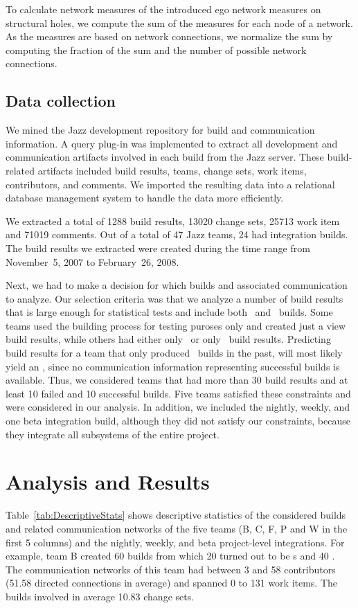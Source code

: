 To calculate network measures of the introduced ego network measures on
structural holes, we compute the sum of the measures for each node of a network.
As the measures are based on network connections, we normalize the sum by
computing the fraction of the sum and the number of possible network connections.

\subsection{Data collection} 

We mined the Jazz development repository for build and communication information.
A query plug-in was implemented to extract all development and communication
artifacts involved in each build from the Jazz server. These build-related
artifacts included build results, teams, change sets, work items, contributors,
and comments. We imported the resulting data into a relational database
management system to handle the data more efficiently.

We extracted a total of 1288 build results, 13020 change sets, 25713 work item
and 71019 comments. Out of a total of 47 Jazz teams, 24 had integration builds.
The build results we extracted were created during the time range from
November~5, 2007 to February~26, 2008.

Next, we had to make a decision for which builds and associated communication to
analyze. Our selection criteria was that we analyze a number of build results
that is large enough for statistical tests and include both \ok\ and \error\
builds. Some teams used the building process for testing puroses only and created
just a view build results, while others had either only \ok\ or only \error\
build results. Predicting build results for a team that only produced \error\
builds in the past, will most likely yield an \error, since no communication
information representing successful builds is available. Thus, we considered
teams that had more than 30 build results and at least 10 failed and 10
successful builds. Five teams satisfied these constraints and were considered in
our analysis. In addition, we included the nightly, weekly, and one beta
integration build, although they did not satisfy our constraints, because 
they integrate all subsystems of the entire project.






\section{Analysis and Results}
\label{sec:AnalysisResults}
Table~\ref{tab:DescriptiveStats} shows descriptive statistics of the considered
builds and related communication networks of the five teams (B, C, F, P and W in
the first 5 columns) and the nightly, weekly, and beta project-level
integrations. For example, team B created 60 builds from which 20 turned out to
be \error s and 40 \ok. The communication networks of this team had between 3 and
58 contributors (51.58 directed connections in average) and spanned 0 to 131 work
items. The builds involved in average 10.83 change sets.

